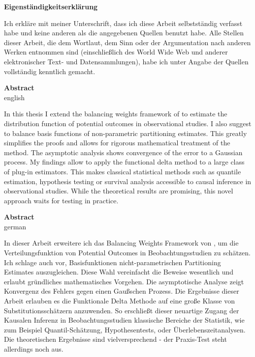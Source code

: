 \documentclass[11pt, a4paper, BCOR=7mm, DIV=11]{scrbook}
\theoremstyle{definition}
\theoremstyle{plain}
\begin{document}
\newpage
\begin{center}
\textbf{
Eigenständigkeitserklärung
}
\end{center}
Ich erkläre mit meiner Unterschrift,
dass ich diese Arbeit selbstständig verfasst habe und keine
anderen als die angegebenen Quellen benutzt habe.
Alle Stellen dieser Arbeit, die dem Wortlaut,
dem Sinn oder der Argumentation nach anderen Werken entnommen sind 
(einschließlich des World
Wide Web und anderer elektronischer Text- und Datensammlungen), habe ich unter Angabe der
Quellen vollständig kenntlich gemacht.
\newpage
  \begin{center}
  \textbf{Abstract} \\
  english
  \end{center}
  In this thesis I extend the balancing weights framework of \cite{Wang2019} to estimate the distribution function of potential outcomes in observational studies.
  I also suggest to balance basis functions of non-parametric partitioning estimates. 
  This greatly simplifies the proofs and allows for rigorous mathematical treatment of the method.
  The asymptotic analysis shows convergence of the error to a Gaussian process.
  My findings allow to apply the functional delta method to a large class of plug-in estimators.
  This makes classical statistical methods such as quantile estimation, hypothesis testing or survival analysis accessible to causal inference in observational studies.
  While the theoretical results are promising, this novel approach waits for testing in practice.
\newpage
  \begin{center}
  \textbf{Abstract}
  \\
  german
  \end{center}
  In dieser Arbeit erweitere ich das Balancing Weights Framework von \cite{Wang2019}, um die Verteilungsfunktion von Potential Outcomes in Beobachtungsstudien zu schätzen.
  Ich schlage auch vor, Basisfunktionen nicht-parametrischen Partitioning Estimates auszugleichen.
  Diese Wahl vereinfacht die Beweise wesentlich und erlaubt gründliches mathematisches Vorgehen.
  Die asymptotische Analyse zeigt Konvergenz des Fehlers gegen einen Gaußschen Prozess.
  Die Ergebnisse dieser Arbeit erlauben es die Funktionale Delta Methode auf eine große Klasse von Substitutionsschätzern anzuwenden.
  So erschließt dieser neuartige Zugang der Kausalen Inferenz in Beobachtungsstudien klassische Bereiche der Statistik, wie zum Beispiel Quantil-Schätzung, Hypothesentests, oder Überlebenszeitanalysen.
  Die theoretischen Ergebnisse sind vielversprechend - der Praxis-Test steht allerdings noch aus.
\tableofcontents 
\mainmatter
{}
\end{document}
